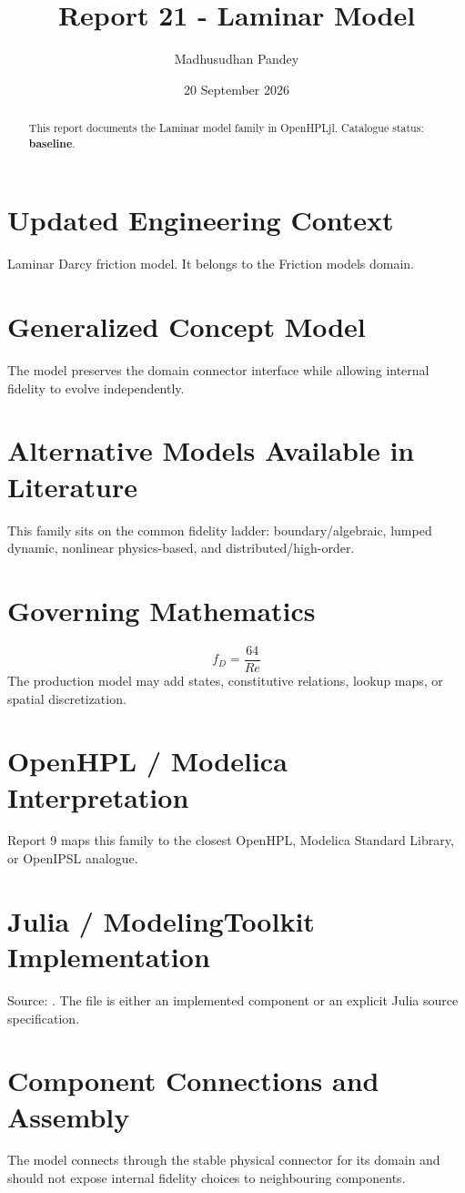 \documentclass[10pt,a4paper]{article}
\title{Report 21 - Laminar Model}
\author{Madhusudhan Pandey}
\date{20 September 2026}
\begin{document}
\maketitle
\begin{abstract}This report documents the Laminar model family in OpenHPLjl. Catalogue status: \textbf{baseline}.\end{abstract}
\section{Updated Engineering Context}Laminar Darcy friction model. It belongs to the Friction models domain.
\section{Generalized Concept Model}The model preserves the domain connector interface while allowing internal fidelity to evolve independently.
\section{Alternative Models Available in Literature}This family sits on the common fidelity ladder: boundary/algebraic, lumped dynamic, nonlinear physics-based, and distributed/high-order.
\section{Governing Mathematics}\[f_D=\frac{64}{Re}\]The production model may add states, constitutive relations, lookup maps, or spatial discretization.
\section{OpenHPL / Modelica Interpretation}Report 9 maps this family to the closest OpenHPL, Modelica Standard Library, or OpenIPSL analogue.
\section{Julia / ModelingToolkit Implementation}Source: \texttt{}. The file is either an implemented component or an explicit Julia source specification.
\section{Component Connections and Assembly}The model connects through the stable physical connector for its domain and should not expose internal fidelity choices to neighbouring components.
\end{document}
